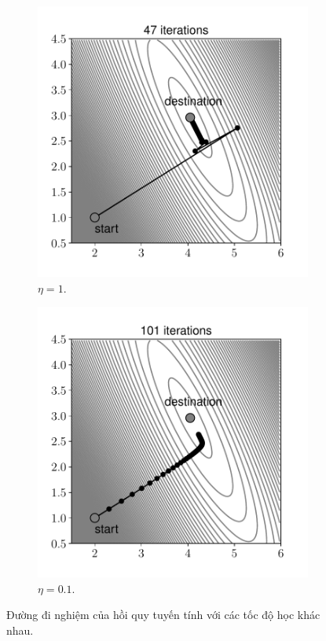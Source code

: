 \begin{figure}[t]
    \begin{subfigure}{0.495\textwidth}
    \includegraphics[width=0.99\linewidth]{ebookML_src/src/grad_descent/LR_gd_1.pdf}
    \caption{$\eta = 1$.}
    \label{fig:7_lrgda}
    \end{subfigure}
    \begin{subfigure}{0.495\textwidth}
    \includegraphics[width=0.99\linewidth]{ebookML_src/src/grad_descent/LR_gd_2.pdf}
    \caption{$\eta = 0.1$.}
    \label{fig:7_lrgdb}
    \end{subfigure}
    \caption{
    Đường đi nghiệm của hồi quy tuyến tính với các tốc độ học khác nhau. 
    }
    \label{fig:7_lrgd}
\end{figure}

